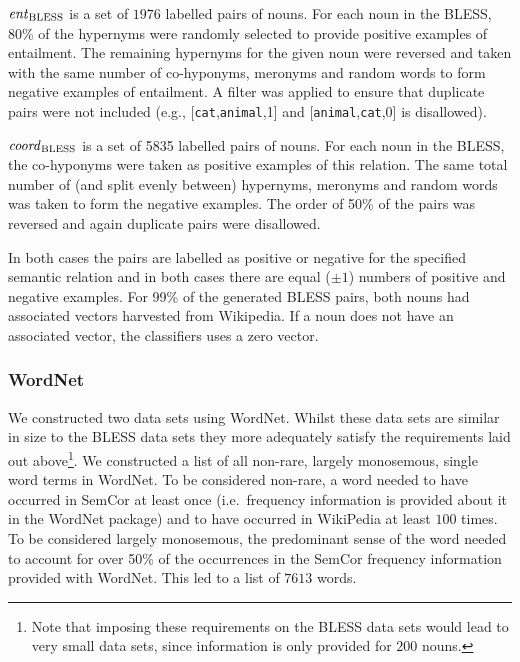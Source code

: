 \documentclass[11pt]{article}
\newcommand\entBLESS{\mbox{\em ent\/}_{\mbox{\scriptsize BLESS}}}
\newcommand\coordBLESS{\mbox{\em coord\/}_{\mbox{\scriptsize BLESS}}}
\begin{document}
\noindent $\entBLESS$ is a set of $1976$ labelled pairs of nouns.  For each noun in the BLESS, 80\% of the hypernyms were randomly selected to provide positive examples of entailment.  The remaining hypernyms for the given noun were reversed and taken with the same number of co-hyponyms, meronyms and random words to form negative examples of entailment.  A filter was applied to ensure that duplicate pairs were not included (e.g., [\texttt{cat},\texttt{animal},1] and [\texttt{animal},\texttt{cat},0] is disallowed). 

\smallskip

\noindent $\coordBLESS$ is a set of 5835 labelled pairs of nouns.  For each noun in the BLESS, the co-hyponyms were taken as positive examples of this relation.  The same total number of (and split evenly between) hypernyms, meronyms and random words was taken to form the negative examples.  The order of 50\% of the pairs was reversed and again duplicate pairs were disallowed. 

\smallskip

In both cases the pairs are labelled as positive or negative for the specified semantic relation and in both cases there are equal ($\pm 1$) numbers of positive and negative examples.  For 99\% of the generated BLESS pairs, both nouns had associated vectors harvested from Wikipedia.  If a noun does not have an associated vector, the classifiers uses a zero vector.  

\subsubsection{WordNet}

We  constructed two data sets using WordNet.  Whilst these data sets are similar in size to the BLESS data sets they more adequately satisfy the requirements laid out above\footnote{Note that imposing these requirements on the BLESS data sets would lead to very small data sets, since information is only provided for $200$ nouns.}.  We constructed a list of all non-rare, largely monosemous, single word terms in WordNet.  To be considered non-rare, a word needed to have occurred in SemCor at least once (i.e.~frequency information is provided about it in the WordNet package) and to have occurred in WikiPedia at least $100$ times.  To be considered largely monosemous, the predominant sense of the word needed to account for over 50\% of the occurrences in the SemCor frequency information provided with WordNet.  This led to a list of $7613$ words. 
\end{document}
